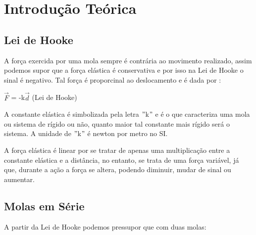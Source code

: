 \documentclass[
	12pt,				%
	oneside,			%
	a4paper,			%
	english,			%
	french,				%
	spanish,			%
	brazil,				%
	]{abntex2}
\begin{document}

\newpage
\section[Introdução Teórica]{Introdução Teórica}
\pagestyle{fancy}
\subsection[Lei de Hooke]{Lei de Hooke} 

A força exercida por uma mola sempre é contrária ao movimento realizado, assim podemos supor que a força elástica é conservativa e por isso na Lei de Hooke o sinal é negativo. Tal força é proporcinal ao deslocamento e é dada por \cite{hallidayfundamentos}:

\begin{center}

 $\vec{F}$ = -k$\vec{d}$ \qquad (Lei de Hooke)

\end{center}

A constante elástica é simbolizada pela letra $"$k$"$ e é o que caracteriza uma mola ou sistema de rígido ou não, quanto maior tal constante mais rígido será o sistema. A unidade de $"$k$"$ é newton por metro no SI. \cite{hallidayfundamentos}

A força elástica é linear por se tratar de apenas uma multiplicação entre a constante elástica e a distância, no entanto, se trata de uma força variável, já que, durante a ação a força se altera, podendo diminuir, mudar de sinal ou aumentar. \cite{hallidayfundamentos}

\subsection[Molas em Série]{Molas em Série} 
A partir da Lei de Hooke podemos pressupor que com duas molas:
\end{document}
